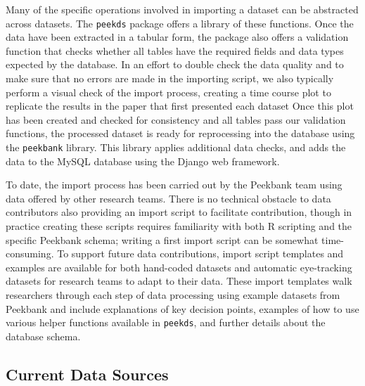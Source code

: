 \documentclass[
  english,
  man,floatsintext]{apa6}
\begin{document}
Many of the specific operations involved in importing a dataset can be abstracted across datasets.
The \texttt{peekds} package offers a library of these functions.
Once the data have been extracted in a tabular form, the package also offers a validation function that checks whether all tables have the required fields and data types expected by the database.
In an effort to double check the data quality and to make sure that no errors are made in the importing script, we also typically perform a visual check of the import process, creating a time course plot to replicate the results in the paper that first presented each dataset
Once this plot has been created and checked for consistency and all tables pass our validation functions, the processed dataset is ready for reprocessing into the database using the \texttt{peekbank} library.
This library applies additional data checks, and adds the data to the MySQL database using the Django web framework.

To date, the import process has been carried out by the Peekbank team using data offered by other research teams.
There is no technical obstacle to data contributors also providing an import script to facilitate contribution, though in practice creating these scripts requires familiarity with both R scripting and the specific Peekbank schema; writing a first import script can be somewhat time-consuming.
To support future data contributions, import script templates and examples are available for both hand-coded datasets and automatic eye-tracking datasets for research teams to adapt to their data.
These import templates walk researchers through each step of data processing using example datasets from Peekbank and include explanations of key decision points, examples of how to use various helper functions available in \texttt{peekds}, and further details about the database schema.

\hypertarget{current-data-sources}{%
\subsection{Current Data Sources}\label{current-data-sources}}
\end{document}
